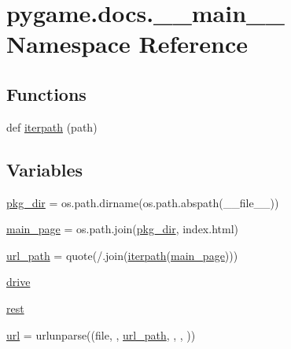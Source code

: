 \hypertarget{namespacepygame_1_1docs_1_1____main____}{}\section{pygame.\+docs.\+\_\+\+\_\+main\+\_\+\+\_\+ Namespace Reference}
\label{namespacepygame_1_1docs_1_1____main____}
\subsection*{Functions}
\begin{DoxyCompactItemize}
\item 
def \hyperlink{namespacepygame_1_1docs_1_1____main_____aa3927023e6bbbb361b7a23b4d8a1dca2}{iterpath} (path)
\end{DoxyCompactItemize}
\subsection*{Variables}
\begin{DoxyCompactItemize}
\item 
\hyperlink{namespacepygame_1_1docs_1_1____main_____ace973fe5109b359d19fad7c2a8a0956c}{pkg\+\_\+dir} = os.\+path.\+dirname(os.\+path.\+abspath(\+\_\+\+\_\+file\+\_\+\+\_\+))
\item 
\hyperlink{namespacepygame_1_1docs_1_1____main_____af85791b50146174a3241d29b2f397458}{main\+\_\+page} = os.\+path.\+join(\hyperlink{namespacepygame_1_1docs_1_1____main_____ace973fe5109b359d19fad7c2a8a0956c}{pkg\+\_\+dir}, \textquotesingle{}index.\+html\textquotesingle{})
\item 
\hyperlink{namespacepygame_1_1docs_1_1____main_____a8a7fb440bd71a5e2d4a7d4f7fc978f9d}{url\+\_\+path} = quote(\textquotesingle{}/\textquotesingle{}.join(\hyperlink{namespacepygame_1_1docs_1_1____main_____aa3927023e6bbbb361b7a23b4d8a1dca2}{iterpath}(\hyperlink{namespacepygame_1_1docs_1_1____main_____af85791b50146174a3241d29b2f397458}{main\+\_\+page})))
\item 
\hyperlink{namespacepygame_1_1docs_1_1____main_____a2c0d081dcb6e2bdc8a75d88c5df5ebdb}{drive}
\item 
\hyperlink{namespacepygame_1_1docs_1_1____main_____a4f01905a20845c6ce93b7792fab520c8}{rest}
\item 
\hyperlink{namespacepygame_1_1docs_1_1____main_____a9c162e5b618d71bced3b2ca76c1440f0}{url} = urlunparse((\textquotesingle{}file\textquotesingle{}, \textquotesingle{}\textquotesingle{}, \hyperlink{namespacepygame_1_1docs_1_1____main_____a8a7fb440bd71a5e2d4a7d4f7fc978f9d}{url\+\_\+path}, \textquotesingle{}\textquotesingle{}, \textquotesingle{}\textquotesingle{}, \textquotesingle{}\textquotesingle{}))
\end{DoxyCompactItemize}


